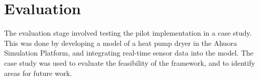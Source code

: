 \section{Evaluation}

The evaluation stage involved testing the pilot implementation in a case study. This was done by developing a model of a heat pump dryer in the Ahuora Simulation Platform, and integrating real-time sensor data into the model. The case study was used to evaluate the feasibility of the framework, and to identify areas for future work.

